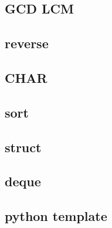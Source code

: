         \subsection{GCD LCM}
                
        \subsection{reverse}
                
        \subsection{CHAR}
                
        \subsection{sort}
                
        \subsection{struct}
                
        \subsection{deque}
                
        \subsection{python template}
                    